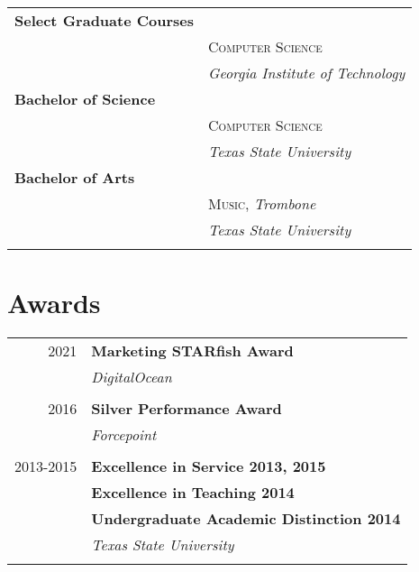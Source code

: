 \documentclass[10pt]{article} %
\begin{document}
\begin{minipage}[t]{0.44\textwidth}
\begin{tabular}{ll}
\textbf{Select Graduate Courses} \\ 
& \textsc{Computer Science} \\ 
& \textit{Georgia Institute of Technology}\\


\textbf{Bachelor of Science} \\ 
& \textsc{Computer Science} \\ 
& \textit{Texas State University}\\

     

\textbf{Bachelor of Arts} \\ 
& \textsc{Music}, \textit{Trombone}\\ 
& \textit{Texas State University}\\ \\

\end{tabular}



\section{Awards} 

\begin{tabular}{rl}

2021     & \textbf{Marketing STARfish Award}\\
& \textit{DigitalOcean} \\\\

2016     & \textbf{Silver Performance Award}\\
& \textit{Forcepoint}\\ \\

2013-2015     & \textbf{Excellence in Service 2013, 2015}\\
& \textbf{Excellence in Teaching 2014}\\
& \textbf{Undergraduate Academic Distinction 2014}\\
& \textit{Texas State University}\\\\


\end{tabular}
\end{minipage}
\end{document}

